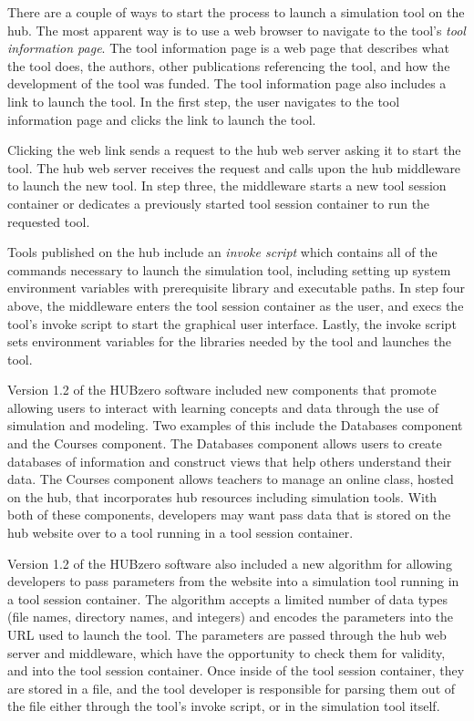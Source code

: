 \documentclass[letterpaper]{scrartcl}
\begin{document}
There are a couple of ways to start the process to launch a simulation tool on
the hub. The most apparent way is to use a web browser to navigate to the
tool's \textit{tool information page}. The tool information page is a web page
that describes what the tool does, the authors, other publications referencing
the tool, and how the development of the tool was funded. The tool information
page also includes a link to launch the tool. In the first step, the user
navigates to the tool information page and clicks the link to launch the tool.


Clicking the web link sends a request to the hub web server asking it to start
the tool. The hub web server receives the request and calls upon the hub
middleware to launch the new tool.  In step three, the middleware starts a new
tool session container or dedicates a previously started tool session container
to run the requested tool.

Tools published on the hub include an \textit{invoke script} which contains all
of the commands necessary to launch the simulation tool, including setting up
system environment variables with prerequisite library and executable paths.
In step four above, the middleware enters the tool session container as the
user, and execs the tool's invoke script to start the graphical user interface.
Lastly, the invoke script sets environment variables for the libraries needed
by the tool and launches the tool.

Version 1.2 of the HUBzero software included new components that promote
allowing users to interact with learning concepts and data through the use of
simulation and modeling. Two examples of this include the Databases component
and the Courses component. The Databases component allows users to create
databases of information and construct views that help others understand their
data. The Courses component allows teachers to manage an online class, hosted
on the hub, that incorporates hub resources including simulation tools.  With
both of these components, developers may want pass data that is stored on the
hub website over to a tool running in a tool session container.

Version 1.2 of the HUBzero software also included a new algorithm for allowing
developers to pass parameters from the website into a simulation tool running
in a tool session container. The algorithm accepts a limited number of data
types (file names, directory names, and integers) and encodes the parameters
into the URL used to launch the tool. The parameters are passed through the hub
web server and middleware, which have the opportunity to check them for
validity, and into the tool session container. Once inside of the tool session
container, they are stored in a file, and the tool developer is responsible for
parsing them out of the file either through the tool's invoke script, or in the
simulation tool itself.
\end{document}
